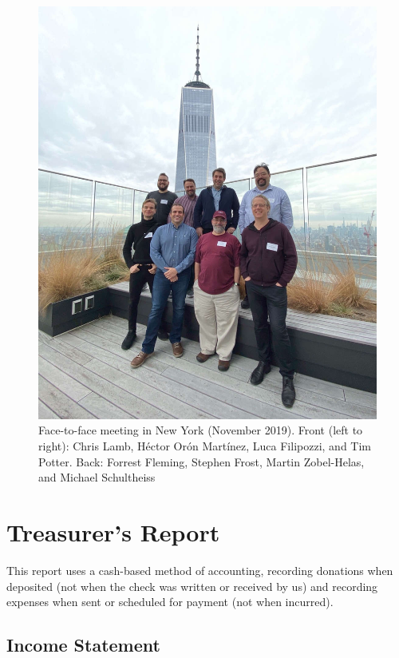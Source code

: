 \documentclass[a4paper]{report}
\begin{document}
\begin{figure}[h]
\centering

\includegraphics[scale=1.25]{images/2019-november-f2f}

\caption{Face-to-face meeting in New York (November 2019). Front (left
to right): Chris Lamb, Héctor Orón Martínez, Luca Filipozzi, and Tim
Potter.  Back: Forrest Fleming, Stephen Frost, Martin Zobel-Helas,
and Michael Schultheiss}

\end{figure}

\chapter{Treasurer's Report}

This report uses a cash-based method of accounting, recording donations
when deposited (not when the check was written or received by us) and
recording expenses when sent or scheduled for payment (not when
incurred).

\section{Income Statement}
\end{document}
